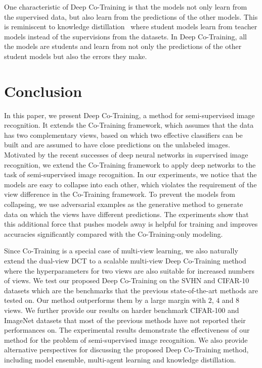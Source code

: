 \documentclass[runningheads]{llncs}
\begin{document}
One characteristic of Deep Co-Training is that the models not only learn from the supervised data, but also learn from the predictions of the other models.
This is reminiscent to knowledge distillation~\cite{distill} where student models learn from teacher models instead of the supervisions from the datasets.
In Deep Co-Training, all the models are students and learn from not only the predictions of the other student models but also the errors they make.

\section{Conclusion}
In this paper, we present Deep Co-Training, a method for semi-supervised image recognition.
It extends the Co-Training framework, which assumes that the data has two complementary views, based on which two effective classifiers
can be built and are assumed to have close predictions on the unlabeled images.
Motivated by the recent successes of deep neural networks in supervised image recognition, we extend the Co-Training framework to apply deep networks to the task of semi-supervised image recognition.
In our experiments, we notice that the models are easy to collapse into each other, which violates the requirement of the view difference in the Co-Training framework.
To prevent the models from collapsing, we use adversarial examples as the generative method to generate data on which the views have different predictions.
The experiments show that this additional force that pushes models away is helpful for training and improves accuracies significantly compared with the Co-Training-only modeling.

Since Co-Training is a special case of multi-view learning, we also naturally extend the dual-view DCT to a scalable multi-view Deep Co-Training method where the hyperparameters for two views are also suitable for increased numbers of views.
We test our proposed Deep Co-Training on the SVHN and CIFAR-10 datasets which are the benchmarks that the previous state-of-the-art methods are tested on.
Our method outperforms them by a large margin with $2$, $4$ and $8$ views.
We further provide our results on harder benchmark CIFAR-100 and ImageNet datasets that most of the previous methods have not reported their performances on.
The experimental results demonstrate the effectiveness of our method for the problem of semi-supervised image recognition.
We also provide alternative perspectives for discussing the proposed Deep Co-Training method, including model ensemble, multi-agent learning and knowledge distillation.



\small


\end{document}
